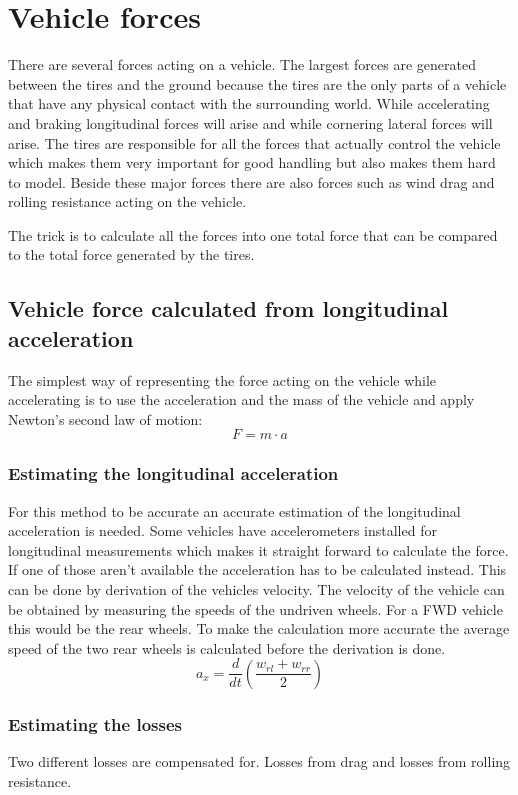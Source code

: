 \section{Vehicle forces}
There are several forces acting on a vehicle. The largest forces are generated between the tires and the ground because the tires are the only parts of a vehicle that have any physical contact with the surrounding world. While accelerating and braking longitudinal forces will arise and while cornering lateral forces will arise. The tires are responsible for all the forces that actually control the vehicle which makes them very important for good handling but also makes them hard to model. Beside these major forces there are also forces such as wind drag and rolling resistance acting on the vehicle.

The trick is to calculate all the forces into one total force that can be compared to the total force generated by the tires.
\subsection{Vehicle force calculated from longitudinal acceleration}
The simplest way of representing the force acting on the vehicle while accelerating is to use the acceleration and the mass of the vehicle and apply Newton's second law of motion:
\begin{equation}
	F = m \cdot a
\end{equation}
\subsubsection{Estimating the longitudinal acceleration}
\label{longaccest}
For this method to be accurate an accurate estimation of the longitudinal acceleration is needed. Some vehicles have accelerometers installed for longitudinal measurements which makes it straight forward to calculate the force. If one of those aren't available the acceleration has to be calculated instead. This can be done by derivation of the vehicles velocity. The velocity of the vehicle can be obtained by measuring the speeds of the undriven wheels. For a FWD vehicle this would be the rear wheels. To make the calculation more accurate the average speed of the two rear wheels is calculated before the derivation is done.
\begin{equation}
a_{x} = \frac{d}{dt}(\frac{w_{rl}+w_{rr}}{2})
\end{equation}

\subsubsection{Estimating the losses}
Two different losses are compensated for. Losses from drag and losses from rolling resistance.

